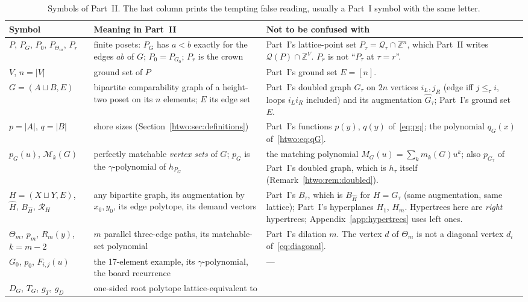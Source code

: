 \documentclass[11pt]{article}
\numberwithin{equation}{section}
\theoremstyle{definition}
\newcommand{\Z}{\mathbb Z}
\newcommand{\Qt}{\mathcal Q_\tau}
\newcommand{\PM}{\mathcal M}
\newcommand{\Qp}{\mathcal Q(P)}
\begin{document}
\begin{table}[htbp]
\centering\small
\caption{Symbols of Part~II. The last column prints the tempting false
reading, usually a Part~I symbol with the same letter.}
\label{htwo:tab:notation}
\begin{tabularx}{\textwidth}{@{}>{\raggedright}p{}>{\raggedright}p{}Y@{}}
\toprule
Symbol & Meaning in Part~II & Not to be confused with\\
\midrule
$P$, $P_G$, $P_0$, $P_{\Theta_m}$, $P_r$ & finite posets: $P_G$ has $a<b$
 exactly for the edges $ab$ of $G$; $P_0=P_{G_0}$; $P_r$ is the crown &
 Part~I's lattice-point set $P_\tau=\Qt\cap\Z^n$, which Part~II writes
 $\Qp\cap\Z^V$. $P_r$ is not ``$P_\tau$ at $\tau=r$''.\\
$V$, $n=|V|$ & ground set of $P$ & Part~I's ground set $E=[n]$.\\
$G=(A\sqcup B,E)$ & bipartite comparability graph of a height-two poset on
 its $n$ elements; $E$ its edge set & Part~I's doubled graph $G_\tau$ on $2n$
 vertices $i_L,j_R$ (edge iff $j\le_\tau i$, loops $i_Li_R$ included) and its
 augmentation $\widehat G_\tau$; Part~I's ground set $E$.\\
$p=|A|$, $q=|B|$ & shore sizes (Section~\ref{htwo:sec:definitions}) &
 Part~I's functions $p(y)$, $q(y)$ of~\eqref{eq:pq}; the polynomial $q_G(x)$
 of~\eqref{htwo:eq:qG}.\\
$p_G(u)$, $\PM_k(G)$ & perfectly matchable \emph{vertex sets} of $G$; $p_G$ is
 the $\gamma$-polynomial of $h_{P_G}$ & the matching polynomial
 $M_G(u)=\sum_km_k(G)u^k$; also $p_{G_\tau}$ of Part~I's doubled graph, which
 is $h_\tau$ itself (Remark~\ref{htwo:rem:doubled}).\\
$H=(X\sqcup Y,E)$, $\widehat H$, $B_{\widehat H}$, $\mathcal R_H$ & any
 bipartite graph, its augmentation by $x_0,y_0$, its edge polytope, its demand
 vectors & Part~I's $B_\tau$, which is $B_{\widehat H}$ for $H=G_\tau$ (same
 augmentation, same lattice); Part~I's hyperplanes $H_1$, $H_m$. Hypertrees
 here are \emph{right} hypertrees; Appendix~\ref{app:hypertrees} uses left
 ones.\\
$\Theta_m$, $p_m$, $R_m(y)$, $k=m-2$ & $m$ parallel three-edge paths, its
 matchable-set polynomial & Part~I's dilation $m$. The vertex $d$ of
 $\Theta_m$ is not a diagonal vertex $d_i$ of~\eqref{eq:diagonal}.\\
$G_0$, $p_0$, $F_{i,j}(u)$ & the 17-element example, its $\gamma$-polynomial,
 the board recurrence & ---\\
$D_G$, $T_G$, $g_T$, $g_D$ & one-sided root polytope lattice-equivalent to

\end{tabularx}
\end{table}
\end{document}
